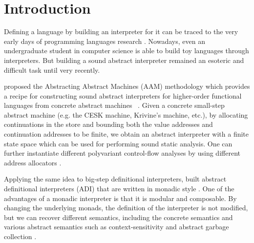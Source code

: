 \documentclass[acmsmall, review]{acmart}\settopmatter{}
\begin{document}


\maketitle


\section{Introduction}

Defining a language by building an interpreter for it can be traced to the very
early days of programming languages research \cite{landin1966next, Reynolds:72}.
Nowadays, even an undergraduate student in computer science is able to build toy 
languages through interpreters.
But building a sound abstract interpreter remained an esoteric and difficult task 
until very recently.

\citeauthor{van2012systematic} proposed the Abstracting Abstract Machines (AAM) 
methodology which provides a recipe for constructing sound abstract interpreters 
for higher-order functional languages from concrete abstract machines 
~\cite{van2012systematic, van2010abstracting}.
Given a concrete small-step abstract machine (e.g. the CESK machine, Krivine's 
machine, etc.), by allocating continuations in the store and bounding both the 
value addresses and continuation addresses to be finite, we obtain an abstract 
interpreter with a finite state space which can be used for performing sound 
static analysis.
One can further instantiate different polyvariant control-flow analyses by using
different address allocators \cite{Gilray:2016:ACP:2951913.2951936}.

Applying the same idea to big-step definitional interpreters, \citeauthor{darais2017abstracting}
built abstract definitional interpreters (ADI) that are written in monadic style 
\cite{darais2017abstracting}. One of the advantages of a monadic interpreter is 
that it is modular and composable. By changing the underlying monads, the definition
of the interpreter is not modified, but we can recover different semantics, including
the concrete semantics and various abstract semantics such as context-sensitivity and
abstract garbage collection \cite{Sergey:2013:MAI:2491956.2491979}.
\end{document}
